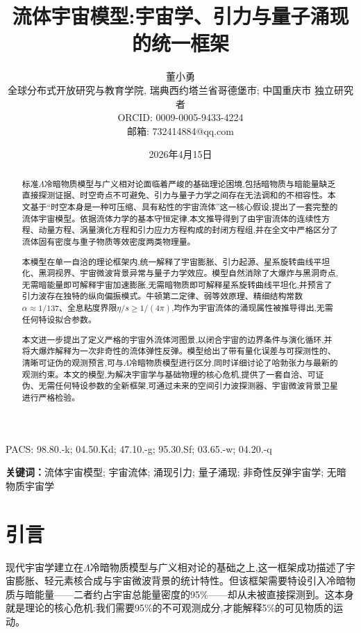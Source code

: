 \documentclass[11pt,a4paper]{article}
\title{流体宇宙模型:宇宙学、引力与量子涌现的统一框架}
\author{
董小勇\\
全球分布式开放研究与教育学院, 瑞典西约塔兰省哥德堡市; 中国重庆市 独立研究者\\
ORCID: 0009-0005-9433-4224\\
邮箱: 732414884@qq.com
}
\date{2026年4月15日}
\newcommand{\keywords}[1]{\par\small\noindent\textbf{关键词：}#1\par}
\begin{document}
\maketitle


\begin{center}
PACS: 98.80.-k; 04.50.Kd; 47.10.-g; 95.30.Sf; 03.65.-w; 04.20.-q
\end{center}

\begin{abstract}
标准$\Lambda$冷暗物质模型与广义相对论面临着严峻的基础理论困境,包括暗物质与暗能量缺乏直接探测证据、时空奇点不可避免、引力与量子力学之间存在无法调和的不相容性。本文基于``时空本身是一种可压缩、具有粘性的宇宙流体''这一核心假设,提出了一套完整的流体宇宙模型。依据流体力学的基本守恒定律,本文推导得到了由宇宙流体的连续性方程、动量方程、涡量演化方程和引力应力方程构成的封闭方程组,并在全文中严格区分了流体固有密度与重子物质等效密度两类物理量。

本模型在单一自洽的理论框架内,统一解释了宇宙膨胀、引力起源、星系旋转曲线平坦化、黑洞视界、宇宙微波背景异常与量子力学效应。模型自然消除了大爆炸与黑洞奇点,无需暗能量即可解释宇宙加速膨胀,无需暗物质即可解释星系旋转曲线平坦化,并预言了引力波存在独特的纵向偏振模式。牛顿第二定律、弱等效原理、精细结构常数$\alpha\approx1/137$、全息粘度界限$\eta/s\geq1/(4\pi)$,均作为宇宙流体的涌现属性被推导得出,无需任何特设拟合参数。

本文进一步提出了定义严格的宇宙外流体河图景,以闭合宇宙的边界条件与演化循环,并将大爆炸解释为一次非奇性的流体弹性反弹。模型给出了带有量化误差与可探测性的、清晰可证伪的观测预言,可与$\Lambda$冷暗物质模型进行区分,同时详细讨论了哈勃张力与最新的观测约束。本文的模型,为解决宇宙学与基础物理的核心危机,提供了一套自洽、可证伪、无需任何特设参数的全新框架,可通过未来的空间引力波探测器、宇宙微波背景卫星进行严格检验。
\end{abstract}

\keywords{流体宇宙模型; 宇宙流体; 涌现引力; 量子涌现; 非奇性反弹宇宙学; 无暗物质宇宙学}

\section{引言}
现代宇宙学建立在$\Lambda$冷暗物质模型与广义相对论的基础之上,这一框架成功描述了宇宙膨胀、轻元素核合成与宇宙微波背景的统计特性。但该框架需要特设引入冷暗物质与暗能量——二者约占宇宙总能量密度的95\%——却从未被直接探测到。这本身就是理论的核心危机:我们需要95\%的不可观测成分,才能解释5\%的可见物质的运动。
\end{document}
